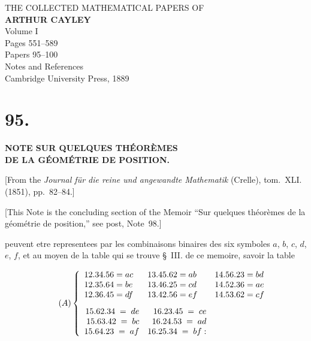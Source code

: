 \documentclass[12pt,a4paper]{article}
\newcommand{\src}[1]{\par\begin{center}\small[#1]\end{center}\par\medskip}
\begin{document}
\thispagestyle{empty}
\begin{titlepage}
\begin{center}
\vspace*{2cm}
{\Large THE COLLECTED MATHEMATICAL PAPERS OF}\\[1em]
{\LARGE\bfseries ARTHUR CAYLEY}\\[2em]
{\Large Volume I}\\[1em]
{\large Pages 551--589}\\[0.5em]
{\large Papers 95--100}\\[0.5em]
{\large Notes and References}\\[2em]
{\normalsize Cambridge University Press, 1889}
\end{center}
\end{titlepage}

\newpage
\setcounter{page}{551}

\section*{95.}

\begin{center}
{\Large\bfseries NOTE SUR QUELQUES TH\'{E}OR\`{E}MES\\DE LA G\'{E}OM\'{E}TRIE DE POSITION.}
\end{center}

\src{From the \textit{Journal f\"{u}r die reine und angewandte Mathematik} (Crelle), tom.~XLI. (1851), pp.~82--84.}

[This Note is the concluding section of the Memoir ``Sur quelques th\'{e}or\`{e}mes de la g\'{e}om\'{e}trie de position,'' see post, Note~98.]

\medskip

peuvent etre representees par les combinaisons binaires des six symboles $a$, $b$, $c$, $d$, $e$, $f$, et au moyen de la table qui se trouve \S~III. de ce memoire, savoir la table

\begin{equation}
\tag{$A$}
\left\{
\begin{array}{r@{\;=\;}l r@{\;=\;}l r@{\;=\;}l}
12.34.56 & ac & 13.45.62 & ab & 14.56.23 & bd \\
12.35.64 & be & 13.46.25 & cd & 14.52.36 & ae \\
12.36.45 & df & 13.42.56 & ef & 14.53.62 & cf \\[0.8em]
\multicolumn{2}{r}{15.62.34\;=\;de} & \multicolumn{2}{r}{16.23.45\;=\;ce} \\
\multicolumn{2}{r}{15.63.42\;=\;bc} & \multicolumn{2}{r}{16.24.53\;=\;ad} \\
\multicolumn{2}{r}{15.64.23\;=\;af} & \multicolumn{2}{r}{16.25.34\;=\;bf:}
\end{array}
\right.
\end{equation}
\end{document}
